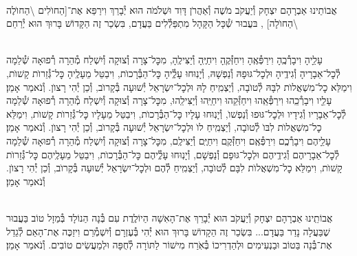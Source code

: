 \documentclass[twoside, openany, parskip=half, 11pt]{book}
\begin{document}
\begin{small}

\\
אֲבוֹתֵינוּ אַבְרָהָם יִצְחָק וְ֯יַעֲקֹב מֹשֶׁה וְ֯אַהֲרֹן דָּוִד וּשְׁלֹמֹה הוּא יְ֯בָרֵךְ וִירַפֵּא אֶת־[הַחוׂלִים \textbackslash הַחוׂלֶה \textbackslash הַחוׂלָה]
,
בּעֲבוּר שְׁ֯כָּל הַקָּהָל מִתְפַּלְ֯לִים בַּעֲדָם, בִּשְׂכַר זֶה
הַקָּדוֹשׁ בָּרוּךְ הוּא יְ֯רַחֵם
\setcolumnwidth{1.4in,1.4in,1.4in}
\begin{paracol}{3}
\\
עָלֵָיהָ וִיבָרְ֯כֶֽהָ וִירַפְּ֯אֶֽהָ וִיחַזְּ֯קֶֽהָ וִיחַיֶּֽהָ וְ֯יַצִּילֶֽהָ, מִכׇּל־צָרָה וְ֯צוּקָה וְ֯יִשְׁלַח מְ֯הֵרָה רְ֯פוּאָה שְׁ֯לֵמָה לְ֯כׇל־אֵבָרָיהָ וְ֯גִידֶֽיהָ וּלְכׇל־גּוּפָהּ וְ֯נַפְשָׁהּ, וְ֯יָנֽוּחוּ עָלְֶ֯יהָ כׇּל־הַבְּ֯רָכוׂת, וִיבַטֵּל מֵעָלֶֽיהָ כׇּל־גְּ֯זֵרוׂת קָשׁוׂת, וִימַלֵּא כׇל־מִשְׁאֲלוׂת לִבָּהּ לְ֯טוׂבָה, וְ֯יַצְמִֽיחַ לָהּ וּלְכׇל־יִשְׂרָאֵל יְ֯שׁוּעָה בְּ֯קָרוׂב, וְ֯כֵן יְ֯הִי רָצוׂן. וְ֯נֹאמַר אָמֵן׃
\switchcolumn
{}\\
עָלֵָיו וִיבָרְ֯כֵֽהוּ וִירַפְּ֯אֵֽהוּ וִיחַזְּ֯קֵהוּ וִיחַיֵּֽהוּ וְ֯יַצִּילֵֽהוּ, מִכׇּל־צָרָה וְ֯צוּקָה וְ֯יִשְׁלַח מְ֯הֵרָה רְ֯פוּאָה שְׁ֯לֵמָה לְ֯כׇל־אֵבָרָיו וְ֯גִידָיו וּלְכׇל־גּוּפוּ וְ֯נַפְשׁוׂ, וְ֯יָנֽוּחוּ עָלָיו כׇּל־הַבְּ֯רָכוׂת, וִיבַטֵּל מֵעָלָיו כׇּל־גְּ֯זֵרוׂת קָשׁוׂת, וִימַלֵּא כׇל־מִשְׁאֲלוׂת לִבּוׂ לְ֯טוׂבָה, וְ֯יַצְמִֽיחַ לוׂ וּלְכׇל־יִשְׂרָאֵל יְ֯שׁוּעָה בְּ֯קָרוׂב, וְ֯כֵן יְ֯הִי רָצוׂן. וְ֯נֹאמַר אָמֵן׃
\switchcolumn
{}\\
עָלֵָיהֶם וִיבָרְ֯כְֶם וִירַפְּ֯אֶֽם וִיחַזְּ֯קֶֽם וִיחַיֶּֽם וְ֯יַצִּילֶֽם, מִכׇּל־צָרָה וְ֯צוּקָה וְ֯יִשְׁלַח מְ֯הֵרָה רְ֯פוּאָה שְׁ֯לֵמָה לְ֯כׇל־אֵבָרָיהֶם וְ֯גִידֶֽיהֶם וּלְכׇל־גּוּפָם וְ֯נַפְשָׁם, וְ֯יָנֽוּחוּ עָלְֶ֯יהֶם כׇּל־הַבְּ֯רָכוׂת, וִיבַטֵּל מֵעָלֶֽיהֶם כׇּל־גְּ֯זֵרוׂת קָשׁוׂת, וִימַלֵּא כׇל־מִשְׁאֲלוׂת לִבָּם לְ֯טוׂבָה, וְ֯יַצְמִֽיחַ לְ֯הֶם וּלְכׇל־יִשְׂרָאֵל יְ֯שׁוּעָה בְּ֯קָרוׂב, וְ֯כֵן יְ֯הִי רָצוׂן. וְ֯נֹאמַר אָמֵן׃
\end{paracol}

\vspace{\baselineskip}

\\
אֲבוֹתֵֽינוּ אַבְרָהָם יִצְחָק וְ֯יַעֲקֹב הוּא יְ֯בָרֵךְ אֶת־הָאִשָׁה הַיוֹלֶֽדֶת
עִם בְּ֯נָה הַנוֹלָד בְּ֯מַזָל טוֹב בַּעֲבוּר שֶׁבַּעֲלָה נָדַר בַּעֲדָם... בִּשְׂכַר זֶה הַקָדוֹשׁ בָּרוּךְ הוּא יְ֯הִי בְּ֯עֶזְרָם וְ֯יִשְׁמְ֯רֵם וִיזַכֶּה אֶת־הָאֵם לְ֯גַדֵל אֶת־בְּ֯נָה בַּטוֹב וּבַנְעִימִים וּלְהַדְרִיכוֹ בְּ֯אֹֽרַח מִישׁוֹר לַתּוֹרָה לְ֯חֻפָּה וּלְמַעֲשִׂים טוֹבִים. וְ֯נֹאמַר אָמֵן׃


\end{small}
\end{document}
